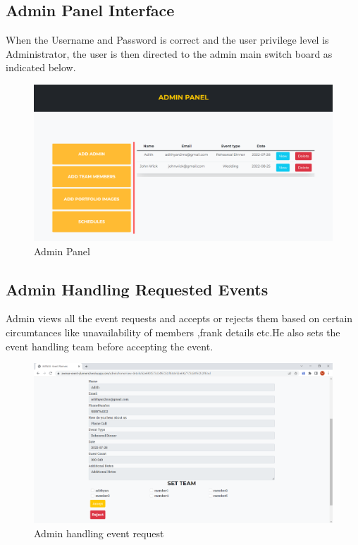 \subsection{Admin Panel Interface}
When the Username and Password is correct and the user privilege level is
Administrator, the user is then directed to the admin main switch board as indicated
below. 
\begin{figure}[H]
	\centering
	\includegraphics[scale=0.25]{adminhome.png}
	\caption{Admin Panel}
	\label{Admin Panel}
\end{figure}
\subsection{Admin Handling Requested Events}
Admin views all the event requests and accepts or rejects them based on certain circumtances like unavailability of members ,frank details etc.He also sets the event handling team before accepting the event.
\begin{figure}[H]
	\centering
	\includegraphics[scale=0.35]{adminview.png}
	\caption{Admin handling event request}
	\label{Admin handling event request}
\end{figure}
